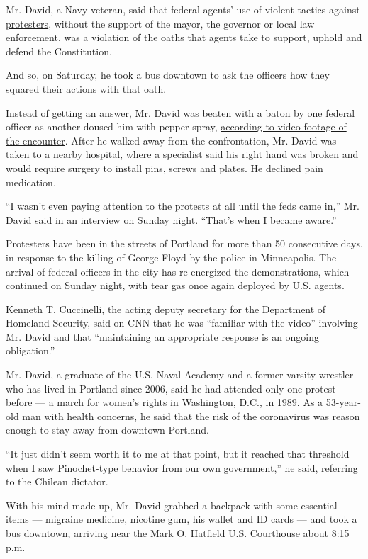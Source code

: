 Mr. David, a Navy veteran, said that federal agents' use of violent
tactics against
\href{https://www.nytimes.com/2020/07/22/us/portland-protests-courthouse.html}{protesters},
without the support of the mayor, the governor or local law enforcement,
was a violation of the oaths that agents take to support, uphold and
defend the Constitution.

And so, on Saturday, he took a bus downtown to ask the officers how they
squared their actions with that oath.

Instead of getting an answer, Mr. David was beaten with a baton by one
federal officer as another doused him with pepper spray,
\href{https://twitter.com/PDXzane/status/1284726088187310080}{according
to video footage of the encounter}. After he walked away from the
confrontation, Mr. David was taken to a nearby hospital, where a
specialist said his right hand was broken and would require surgery to
install pins, screws and plates. He declined pain medication.

``I wasn't even paying attention to the protests at all until the feds
came in,'' Mr. David said in an interview on Sunday night. ``That's when
I became aware.''

Protesters have been in the streets of Portland for more than 50
consecutive days, in response to the killing of George Floyd by the
police in Minneapolis. The arrival of federal officers in the city has
re-energized the demonstrations, which continued on Sunday night, with
tear gas once again deployed by U.S. agents.

Kenneth T. Cuccinelli, the acting deputy secretary for the Department of
Homeland Security, said on CNN that he was ``familiar with the video''
involving Mr. David and that ``maintaining an appropriate response is an
ongoing obligation.''

Mr. David, a graduate of the U.S. Naval Academy and a former varsity
wrestler who has lived in Portland since 2006, said he had attended only
one protest before --- a march for women's rights in Washington, D.C.,
in 1989. As a 53-year-old man with health concerns, he said that the
risk of the coronavirus was reason enough to stay away from downtown
Portland.

``It just didn't seem worth it to me at that point, but it reached that
threshold when I saw Pinochet-type behavior from our own government,''
he said, referring to the Chilean dictator.

With his mind made up, Mr. David grabbed a backpack with some essential
items --- migraine medicine, nicotine gum, his wallet and ID cards ---
and took a bus downtown, arriving near the Mark O. Hatfield U.S.
Courthouse about 8:15 p.m.

